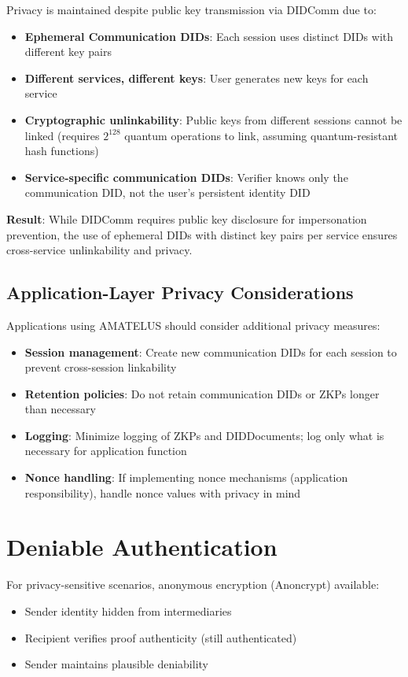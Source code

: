 \begin{theorem}
  \label{thm:privacy-with-didcomm}
  Privacy is maintained despite public key transmission via DIDComm due to:

  \begin{itemize}
    \item \textbf{Ephemeral Communication DIDs}: Each session uses distinct DIDs with different key pairs
    \item \textbf{Different services, different keys}: User generates new keys for each service
    \item \textbf{Cryptographic unlinkability}: Public keys from different sessions cannot be linked
      (requires $2^{128}$ quantum operations to link, assuming quantum-resistant hash functions)
    \item \textbf{Service-specific communication DIDs}: Verifier knows only the communication DID,
      not the user's persistent identity DID
  \end{itemize}

  \textbf{Result}: While DIDComm requires public key disclosure for impersonation prevention,
  the use of ephemeral DIDs with distinct key pairs per service ensures cross-service
  unlinkability and privacy.

  \leanok
\end{theorem}

\subsection{Application-Layer Privacy Considerations}

Applications using AMATELUS should consider additional privacy measures:

\begin{itemize}
  \item \textbf{Session management}: Create new communication DIDs for each session to prevent cross-session linkability
  \item \textbf{Retention policies}: Do not retain communication DIDs or ZKPs longer than necessary
  \item \textbf{Logging}: Minimize logging of ZKPs and DIDDocuments; log only what is necessary for application function
  \item \textbf{Nonce handling}: If implementing nonce mechanisms (application responsibility), handle nonce values with privacy in mind
\end{itemize}

\section{Deniable Authentication}

For privacy-sensitive scenarios, anonymous encryption (Anoncrypt) available:

\begin{itemize}
  \item Sender identity hidden from intermediaries
  \item Recipient verifies proof authenticity (still authenticated)
  \item Sender maintains plausible deniability
\end{itemize}

